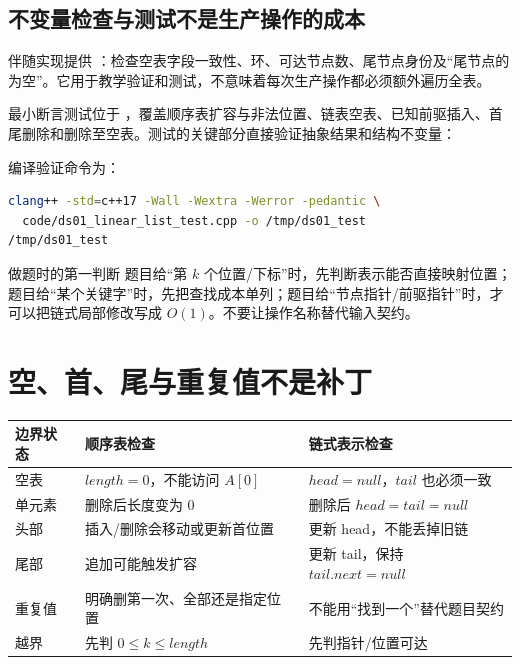 \documentclass[UTF8,fontset=none,11pt,a4paper]{ctexart}
\begin{document}
\subsection{不变量检查与测试不是生产操作的成本}
伴随实现提供 ：检查空表字段一致性、环、可达节点数、尾节点身份及“尾节点的  为空”。它用于教学验证和测试，不意味着每次生产操作都必须额外遍历全表。

最小断言测试位于 ，覆盖顺序表扩容与非法位置、链表空表、已知前驱插入、首尾删除和删除至空表。测试的关键部分直接验证抽象结果和结构不变量：


编译验证命令为：
\begin{lstlisting}[language=bash]
clang++ -std=c++17 -Wall -Wextra -Werror -pedantic \
  code/ds01_linear_list_test.cpp -o /tmp/ds01_test
/tmp/ds01_test
\end{lstlisting}

\begin{methodbox}{做题时的第一判断}
题目给“第 $k$ 个位置/下标”时，先判断表示能否直接映射位置；题目给“某个关键字”时，先把查找成本单列；题目给“节点指针/前驱指针”时，才可以把链式局部修改写成 $O(1)$。不要让操作名称替代输入契约。
\end{methodbox}

\section{空、首、尾与重复值不是补丁}
\begin{center}\small
\begin{tabularx}{\linewidth}{L{2.2cm}YY}
\toprule
边界状态 & 顺序表检查 & 链式表示检查\\
\midrule
空表 & $length=0$，不能访问 $A[0]$ & $head=null$，$tail$ 也必须一致\\
单元素 & 删除后长度变为 0 & 删除后 $head=tail=null$\\
头部 & 插入/删除会移动或更新首位置 & 更新 head，不能丢掉旧链\\
尾部 & 追加可能触发扩容 & 更新 tail，保持 $tail.next=null$\\
重复值 & 明确删第一次、全部还是指定位置 & 不能用“找到一个”替代题目契约\\
越界 & 先判 $0\le k\le length$ & 先判指针/位置可达\\
\bottomrule
\end{tabularx}\end{center}
\end{document}

